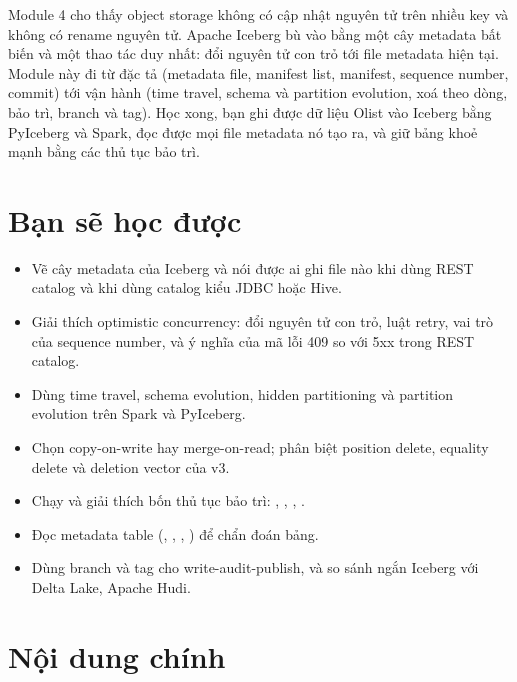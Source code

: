 
Module 4 cho thấy object storage không có cập nhật nguyên tử trên nhiều key và không có rename nguyên tử. Apache Iceberg bù vào bằng một cây metadata bất biến và một thao tác duy nhất: đổi nguyên tử con trỏ tới file metadata hiện tại. Module này đi từ đặc tả (metadata file, manifest list, manifest, sequence number, commit) tới vận hành (time travel, schema và partition evolution, xoá theo dòng, bảo trì, branch và tag). Học xong, bạn ghi được dữ liệu Olist vào Iceberg bằng PyIceberg và Spark, đọc được mọi file metadata nó tạo ra, và giữ bảng khoẻ mạnh bằng các thủ tục bảo trì.

\section{Bạn sẽ học được}
\begin{itemize}
  \item Vẽ cây metadata của Iceberg và nói được ai ghi file nào khi dùng REST catalog và khi dùng catalog kiểu JDBC hoặc Hive.
  \item Giải thích optimistic concurrency: đổi nguyên tử con trỏ, luật retry, vai trò của sequence number, và ý nghĩa của mã lỗi 409 so với 5xx trong REST catalog.
  \item Dùng time travel, schema evolution, hidden partitioning và partition evolution trên Spark và PyIceberg.
  \item Chọn copy-on-write hay merge-on-read; phân biệt position delete, equality delete và deletion vector của v3.
  \item Chạy và giải thích bốn thủ tục bảo trì: , , , .
  \item Đọc metadata table (, , , ) để chẩn đoán bảng.
  \item Dùng branch và tag cho write-audit-publish, và so sánh ngắn Iceberg với Delta Lake, Apache Hudi.
\end{itemize}

\section{Nội dung chính}

